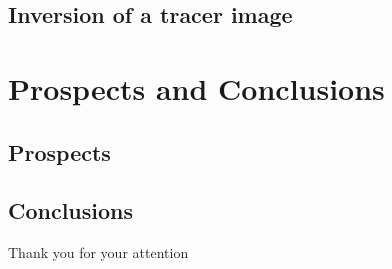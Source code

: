 \documentclass[compress,slidescentered,notes=show]{beamer}
\begin{document}
	\subsection{Inversion of a tracer image}
\begin{frame}
\end{frame}

\section[Conclusion]{Prospects and Conclusions}

	\subsection{Prospects}
\begin{frame}
\end{frame}

	\subsection{Conclusions}
\begin{frame}
\end{frame}

\begin{frame}
\begin{center}
Thank you for your attention 
\end{center}
\end{frame}
\end{document}
